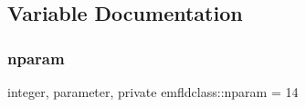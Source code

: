 \subsection{Variable Documentation}
\mbox{\label{namespaceemfldclass_ad6fed90f4153b92a9a9ff35a6ef146c3}} 
\subsubsection{\texorpdfstring{nparam}{nparam}}
{\footnotesize\ttfamily integer, parameter, private emfldclass\+::nparam = 14\hspace{0.3cm}{\ttfamily [private]}}

